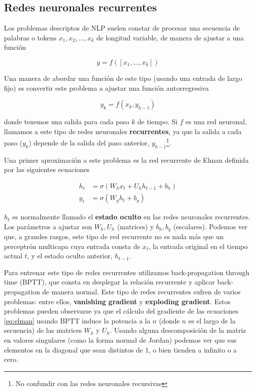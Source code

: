 \subsection{Redes neuronales recurrentes}

Los problemas descriptos de NLP suelen constar de procesar una secuencia de palabras o tokens $x_1, x_2, \ldots, x_k$ de longitud variable, de manera de ajustar a una función

\begin{equation*}
    y = f([x_1, \ldots, x_k])
\end{equation*}

Una manera de abordar una función de este tipo (usando una entrada de largo fijo) es convertir este problema a ajustar una función autorregresiva

\begin{equation*}
    y_k = f(x_k, y_{k-1})
\end{equation*}

donde tenemos una salida para cada paso $k$ de tiempo. Si $f$ es una red neuronal, llamamos a este tipo de redes neuronales \textbf{recurrentes}, ya que la salida a cada paso ($y_k$) depende de la salida del paso anterior, $y_{k-1}$\footnote{No confundir con las redes neuronales recursivas}.

Una primer aproximación a este problema es la red recurrente de Elman \cite{elman1990finding} definida por las siguientes ecuaciones

\begin{align}
h_t &= \sigma(W_h x_t + U_h h_{t-1} + b_h) \\
y_t &= \sigma(W_y h_t + b_y)
\label{eq:elman}
\end{align}

$h_t$ es normalmente llamado el \textbf{estado oculto} en las redes neuronales recurrentes. Los parámetros a ajustar son $W_h, U_h$ (matrices) y $b_h, b_y$ (escalares). Podemos ver que, a grandes rasgos, este tipo de red recurrente no es nada más que un perceptrón multicapa cuya entrada consta de $x_t$, la entrada original en el tiempo actual $t$, y el estado oculto anterior, $h_{t-1}$.

Para entrenar este tipo de redes recurrentes utilizamos back-propagation through time (BPTT), que consta en desplegar la relación recurrente y aplicar back-propagation de manera normal. Este tipo de redes recurrentes sufren de varios problemas: entre ellos, \textbf{vanishing gradient} y \textbf{exploding gradient}. Estos problemas pueden observarse ya que el cálculo del gradiente de las ecuaciones \ref{eq:elman} usando BPTT induce la potencia a la $n$ (donde $n$ es el largo de la secuencia) de las matrices $W_h$ y $U_h$. Usando alguna descomposición de la matriz en valores singulares (como la forma normal de Jordan) podemos ver que sus elementos en la diagonal que sean distintos de 1, o bien tienden a infinito o a cero.


